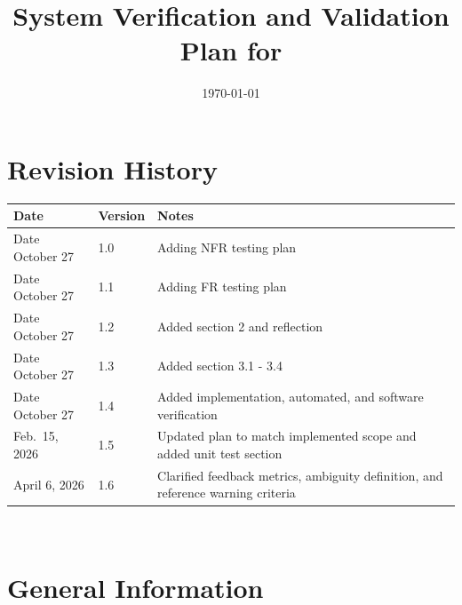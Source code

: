 \documentclass[12pt, titlepage]{article}
\begin{document}
\title{System Verification and Validation Plan for \progname{}} 
\author{\authname}
\date{\today}
	
\maketitle


\section*{Revision History}

\begin{tabularx}{\textwidth}{p{3cm}p{2cm}X}
\toprule {\bf Date} & {\bf Version} & {\bf Notes}\\
\midrule
Date October 27 & 1.0 & Adding NFR testing plan\\
Date October 27 & 1.1 & Adding FR testing plan\\
Date October 27 & 1.2 & Added section 2 and reflection\\
Date October 27 & 1.3 & Added section 3.1 - 3.4\\
Date October 27 & 1.4 & Added implementation, automated, and software verification\\
Feb.\ 15, 2026 & 1.5 & Updated plan to match implemented scope and added unit test section\\
April 6, 2026 & 1.6 & Clarified feedback metrics, ambiguity definition, and reference warning criteria\\
\bottomrule
\end{tabularx}

~\\


\newpage

\tableofcontents

\listoftables

\newpage



\section{General Information}
\end{document}
